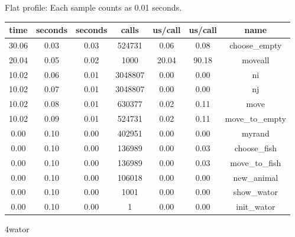 \documentclass[a4paper,10pt]{article}
\begin{document}
Flat profile:
Each sample counts as 0.01 seconds.
\begin{center}
  \begin{tabular}{| c | c | c | c | c | c | c |}
    \hline
 time &   seconds &   seconds &    calls &  us/call &   us/call &   name \\ \hline    
 30.06 &      0.03 &     0.03 &   524731 &     0.06 &      0.08 &   choose\_empty \\ \hline
 20.04 &      0.05 &     0.02 &     1000 &    20.04 &     90.18 &   moveall \\ \hline
 10.02 &      0.06 &     0.01 &  3048807 &     0.00 &      0.00 &   ni \\ \hline
 10.02 &      0.07 &     0.01 &  3048807 &     0.00 &      0.00 &   nj \\ \hline
 10.02 &      0.08 &     0.01 &   630377 &     0.02 &      0.11 &   move \\ \hline
 10.02 &      0.09 &     0.01 &   524731 &     0.02 &      0.11 &   move\_to\_empty \\ \hline
  0.00 &      0.10 &     0.00 &   402951 &     0.00 &      0.00 &   myrand \\ \hline
  0.00 &      0.10 &     0.00 &   136989 &     0.00 &      0.03 &   choose\_fish \\ \hline
  0.00 &      0.10 &     0.00 &   136989 &     0.00 &      0.03 &   move\_to\_fish \\ \hline
  0.00 &      0.10 &     0.00 &   106018 &     0.00 &      0.00 &   new\_animal \\ \hline
  0.00 &      0.10 &     0.00 &     1001 &     0.00 &      0.00 &   show\_wator \\ \hline
  0.00 &      0.10 &     0.00 &        1 &     0.00 &      0.00 &   init\_wator \\ \hline
  \end{tabular}
\end{center}
  
  4wator
\end{document}
